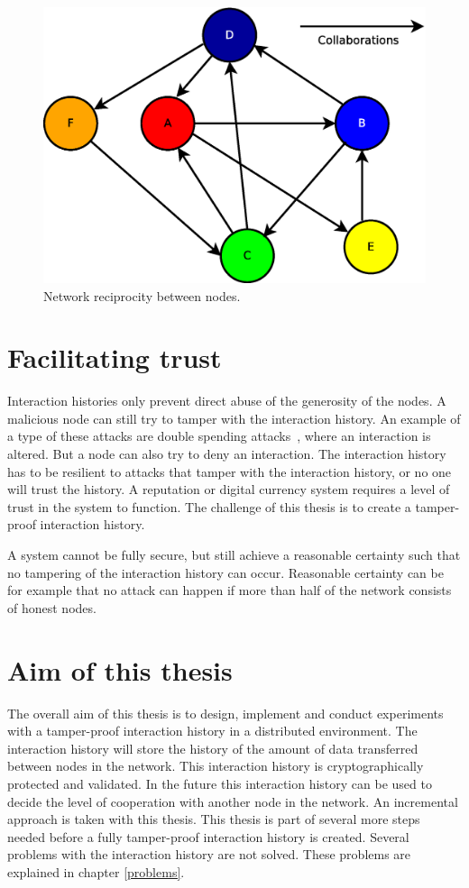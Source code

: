 \begin{figure}
	\centerline{\includegraphics[scale=0.3]{problemDescription/figs/network-reciprocity.eps}}
	\caption{Network reciprocity between nodes.}
	\label{fig:network-reciprocity}
\end{figure}

\section{Facilitating trust}
Interaction histories only prevent direct abuse of the generosity of the nodes.
A malicious node can still try to tamper with the interaction history.
An example of a type of these attacks are double spending attacks~\cite{Nakamoto-bitcoin},
where an interaction is altered.
But a node can also try to deny an interaction.
The interaction history has to be resilient to attacks that tamper with the interaction history,
or no one will trust the history. 
A reputation or digital currency system requires a level of trust in the system to function.
The challenge of this thesis is to create a tamper-proof interaction history.

A system cannot be fully secure, 
but still achieve a reasonable certainty such that no tampering of the interaction history can occur.
Reasonable certainty can be for example that no attack can happen
if more than half of the network consists of honest nodes.

\section{Aim of this thesis}
\label{pb-aim}
The overall aim of this thesis is to design, implement and conduct experiments with a tamper-proof interaction history
in a distributed environment.
The interaction history will store the history of the amount of data transferred between nodes in the network.
This interaction history is cryptographically protected and validated.
In the future this interaction history can be used to decide the level of cooperation with another node in the network.
An incremental approach is taken with this thesis.
This thesis is part of several more steps needed before a fully tamper-proof interaction history is created.
Several problems with the interaction history are not solved.
These problems are explained in chapter \ref{problems}.
